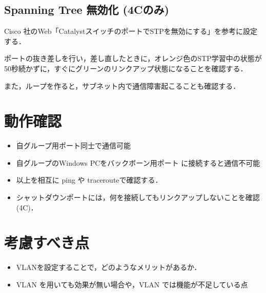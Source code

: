 \subsection{Spanning Tree 無効化 (4Cのみ)}

Cisco 社のWeb「CatalystスイッチのポートでSTPを無効にする」を参考に設定する．

ポートの抜き差しを行い，差し直したときに，オレンジ色のSTP学習中の状態が50秒続かずに，すぐにグリーンのリンクアップ状態になることを確認する．

また，ループを作ると，サブネット内で通信障害起こることも確認する．



\section{動作確認}

\begin{itemize}
 \item 自グループ用ポート同士で通信可能
 \item 自グループのWindows PCをバックボーン用ポート
       に接続すると通信不可能
 \item 以上を相互に ping や tracerouteで確認する．
 \item シャットダウンポートには，何を接続してもリンクアップしないことを確認(4C)．
\end{itemize}

\section{考慮すべき点}

\begin{itemize}
 \item VLANを設定することで，どのようなメリットがあるか．
 \item VLAN を用いても効果が無い場合や，VLAN では機能が不足している点
\end{itemize}
